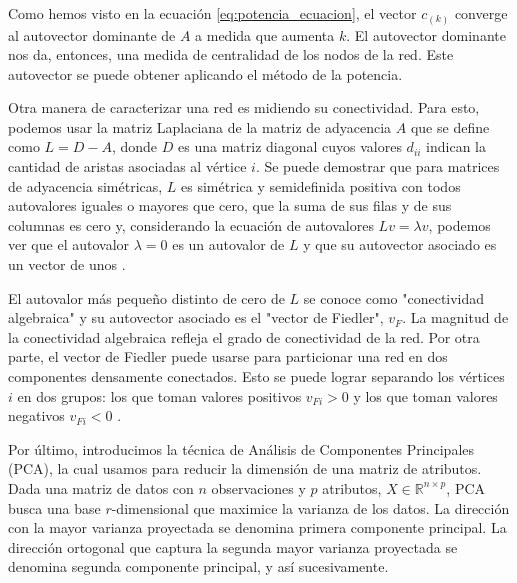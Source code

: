 \documentclass{article}
\begin{document}
Como hemos visto en la ecuación \ref{eq:potencia_ecuacion}, el vector $c_{(k)}$ converge al autovector dominante de $A$ a medida que aumenta $k$. El autovector dominante nos da, entonces, una medida de centralidad de los nodos de la red. Este autovector se puede obtener aplicando el método de la potencia.  

Otra manera de caracterizar una red es midiendo su conectividad. Para esto, podemos usar la matriz Laplaciana de la matriz de adyacencia $A$ que se define como $L = D - A$, donde $D$ es una matriz diagonal cuyos valores $d_{ii}$ indican la cantidad de aristas asociadas al vértice $i$. Se puede demostrar que para matrices de adyacencia simétricas, $L$ es simétrica y semidefinida positiva con todos autovalores iguales o mayores que cero, que la suma de sus filas y de sus columnas es cero y, considerando la ecuación de autovalores $L v = \lambda v$, podemos ver que el autovalor $\lambda = 0$ es un autovalor de $L$ y que su autovector asociado es un vector de unos \citep{dutta2022fiedler}. 

El autovalor más pequeño distinto de cero de $L$ se conoce como "conectividad algebraica" y su autovector asociado es el "vector de Fiedler", $v_F$. La magnitud de la conectividad algebraica refleja el grado de conectividad de la red. Por otra parte, el vector de Fiedler puede usarse para particionar una red en dos componentes densamente conectados. Esto se puede lograr separando los vértices $i$ en dos grupos: los que toman valores positivos $v_{Fi} > 0$ y los que toman valores negativos $v_{Fi} < 0$ \citep{dutta2022fiedler}.


Por último, introducimos la técnica de Análisis de Componentes Principales (PCA), la cual usamos para reducir la dimensión de una matriz de atributos. Dada una matriz de datos con $n$ observaciones y $p$ atributos, $X \in \mathbb{R}^{n \times p}$, PCA busca una base $r$-dimensional que maximice la varianza de los datos. La dirección con la mayor varianza proyectada se denomina primera componente principal. La dirección ortogonal que captura la segunda mayor varianza proyectada se denomina segunda componente principal, y así sucesivamente.
\end{document}
